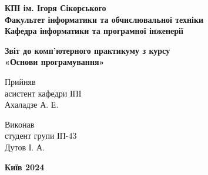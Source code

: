 \begin{titlepage}
	\begin{center}
		{\fontsize{14pt}{16pt}\selectfont\textbf{КПІ ім. Ігоря Сікорського} \\
			\textbf{Факультет інформатики та обчислювальної техніки} \\
			\textbf{Кафедра інформатики та програмної інженерії}}\\
	\end{center}

	\vspace{1cm}

	\begin{center}
		{\fontsize{14}{16pt}\selectfont\textbf{Звіт до комп'ютерного практикуму з курсу}\\
			\textbf{«Основи програмування»}\\}
	\end{center}

	\vspace{6cm}

	\singlespacing
	\begin{multicols}{3}
		{
			\raggedright
			\fontsize{12pt}{12pt} \selectfont
			Прийняв \\
			асистент кафедри ІПІ \\
			Ахаладзе А. Е. \\
			\labdate
		}

		\columnbreak
		\vfill\null
		\columnbreak

		{
			\raggedright
			\fontsize{12pt}{14pt} \selectfont
			Виконав \\
			студент групи ІП-43 \\
			Дутов І. А. \\
		}
	\end{multicols}

	\vfill
	\begin{center}
		{\fontsize{14}{16}\selectfont\textbf{Київ 2024}}
	\end{center}
\end{titlepage}
\newpage
